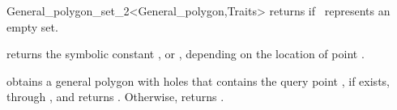 \begin{ccRefClass}{General_polygon_set_2<General_polygon,Traits>}
  {returns  if \ccVar\ represents an empty set.}

  {returns the symbolic constant ,
   or , depending on the
  location of point .}

% 
  {obtains a general polygon with holes that contains the query point
  , if exists, through , and returns
  . Otherwise, returns .}

\ccSeeAlso
  \\
  \\

\end{ccRefClass}

\ccRefPageEnd
